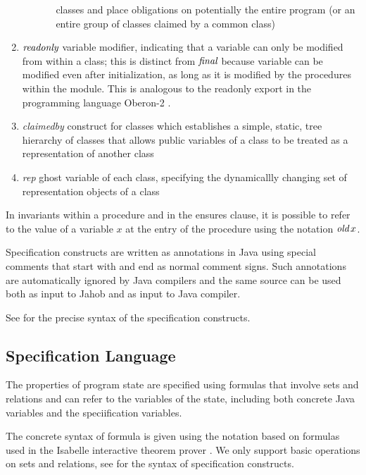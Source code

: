 \begin{enumerate}
\begin{itemize}
\begin{itemize}
            classes and place obligations on potentially the entire program
            (or an entire group of classes claimed by a common class)
          \end{itemize}
      \end{itemize}
\item $\textit{readonly}$ variable modifier, indicating that a variable can
      only be modified from within a class; this is distinct from
      $\textit{final}$ because variable can be modified even after initialization,
      as long as it is modified by the procedures within the module.
      This is analogous to the readonly \q{-} export in the programming language 
      Oberon-2 \cite[Page 127]{Nikitin98InRealmOberon}.
\item \emph{claimedby} construct for classes which establishes a simple, static, tree hierarchy
      of classes that allows public variables of 
      a class to be treated as a representation of another class
\item \emph{rep} ghost variable of each class, specifying the dynamicallly changing
      set of representation objects
      of a class
\end{enumerate}

In invariants within a procedure and in the ensures clause,
it is possible to refer to the value of a variable $x$ at
the entry of the procedure using the notation $\textit{old}\, x$.

Specification constructs are written as annotations in Java
using special comments that start with \q{//:} and end as
normal comment signs.  Such annotations are automatically
ignored by Java compilers and the same source can be used
both as input to Jahob and as input to Java compiler.

See  for the precise syntax of the
specification constructs.

\subsection{Specification Language}

The properties of program state are specified using formulas
that involve sets and relations and can refer to the
variables of the state, including both concrete Java
variables and the speciification variables.

The concrete syntax of formula is given using the notation
based on formulas used in the Isabelle interactive theorem
prover \cite{NipkowETAL02IsabelleHOL}.
We only support basic operations on sets and relations,
see  for the syntax of specification
constructs.

